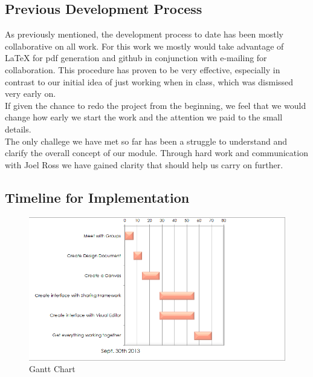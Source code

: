 \documentclass[12pt]{article}
\begin{document}
\subsection{Previous Development Process}
As previously mentioned, the development process to date has been mostly collaborative on all work. For this work we mostly would take advantage of LaTeX for pdf generation and github in conjunction with e-mailing for collaboration. This procedure has proven to be very effective, especially in contrast to our initial idea of just working when in class, which was dismissed very early on. \\
If given the chance to redo the project from the beginning, we feel that we would change how early we start the work and the attention we paid to the small details. \\
The only challege we have met so far has been a struggle to understand and clarify the overall concept of our module. Through hard work and communication with Joel Ross we have gained clarity that should help us carry on further.

\subsection{Timeline for Implementation}
\begin{figure}[ht!]
\centering
\includegraphics{GanttChart.png}
\caption{Gantt Chart}
\label{overflow}
\end{figure}



%
\end{document}

